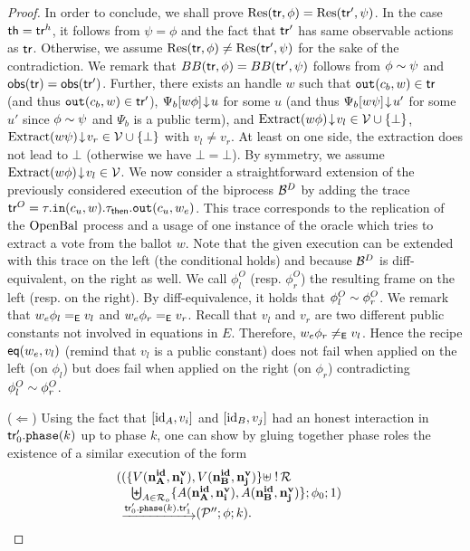 \begin{proof}
In order to conclude,
we shall prove $\mathrm{Res}(\mathsf{tr},\phi)=\mathrm{Res}(\mathsf{tr}',\psi)$.
In the case $\mathsf{th}=\mathsf{tr}^h$, it follows from $\psi=\phi$
and the fact that $\mathsf{tr}'$ has same observable actions as $\mathsf{tr}$.
Otherwise, we assume  $\mathrm{Res}(\mathsf{tr},\phi)\not=\mathrm{Res}(\mathsf{tr}',\psi)$ for the sake of the
contradiction.
We remark that $BB(\mathsf{tr},\phi)=BB(\mathsf{tr}',\psi)$ follows from 
$\phi\sim\psi$ and $\mathsf{obs}(\mathsf{tr})=\mathsf{obs}(\mathsf{tr}')$.
Further, there exists an handle $w$ such that $\mathtt{out}(c_b,w)\in\mathsf{tr}$ (and thus
$\mathtt{out}(c_b,w)\in\mathsf{tr}'$),
$\Psi_b[w\phi]\!\downarrow\! u$ for some $u$ (and thus $\Psi_b[w\psi]\!\downarrow\! u'$ for some $u'$ since $\phi\sim\psi$ and $\Psi_b$ is a public term),
and $\mathrm{Extract}(w\phi)\!\downarrow\! v_l\in\mathcal{V}\cup\{\bot\}$, $\mathrm{Extract}(w\psi)\!\downarrow\! v_r\in\mathcal{V}\cup\{\bot\}$ with $v_l\neq v_r$. At least on one side,
the extraction does not lead to $\bot$ (otherwise we have $\bot=\bot$).
By symmetry, we assume $\mathrm{Extract}(w\phi)\!\downarrow\! v_l\in\mathcal{V}$.
We now consider a straightforward extension of the previously considered execution of the biprocess $\mathcal{B}^{D}$
  by adding the trace $\mathsf{tr}^O=\tau.\mathtt{in}(c_u,w).\tau_{\mathsf{then}}.\mathtt{out}(c_u,w_e)$. This trace corresponds to the replication of the $\mathrm{OpenBal}$
  process and a usage of one instance of the oracle which tries to extract a vote from the ballot $w$.
  Note that the given execution can be extended
  with this trace on the left (the conditional holds) and because $\mathcal{B}^D$ is diff-equivalent, on the right as well.
  We call $\phi_l^O$ (resp. $\phi_r^O$) the resulting frame on the left (resp. on the right).
  By diff-equivalence, it holds that $\phi_l^O\sim\phi_r^O$.
  We remark that $w_e\phi_l=_{\mathsf{E}} v_l$ and
  $w_e\phi_r=_{\mathsf{E}} v_r$. Recall that $v_l$ and $v_r$ are two different public constants not involved in equations
  in $E$. Therefore, $w_e\phi_r\not=_{\mathsf{E}} v_l$.
  Hence the recipe $\mathsf{eq}(w_e, v_l)$ (remind that $v_l$ is a public constant)
  does not fail when applied on the left (\ie on $\phi_l$) but does fail when applied 
  on the right (\ie on $\phi_r$) contradicting $\phi_l^O\sim\phi_r^O$.
  

($\Leftarrow$)
Using the fact that $[\mathrm{id}_A,v_i]$ and $[\mathrm{id}_B,v_j]$ had an honest interaction in $\mathsf{tr}_0'.\mathtt{phase}(k)$ up to phase $k$,
one can show by gluing together phase roles the existence of a similar execution of the form
  \begin{equation}
    \begin{array}{ll}
\displaystyle
((\{
V(\nID{A},\nV{i}),
V(\nID{B},\nV{j})
\}\uplus\;!\,\roles &\\
\phantom{\{ \}}
\biguplus_{A\in\roles_o}
\{A(\nID{A},\nV{i}),
A(\nID{B},\nV{j})\}
;\phi_0;1)\\
\phantom{(}\sint{\tr_0'.\mathtt{phase}(k).\tr_1'}
(\p'';\phi;k).&
    \end{array}
\label{eq:lem-cf-init-other-dir}
\end{equation}


\end{proof}
